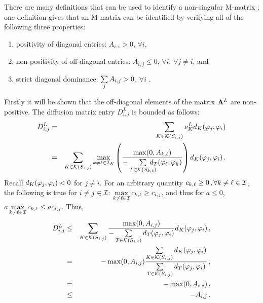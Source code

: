 
\begin{prf}
  There are many definitions that can be used to identify a non-singular M-matrix
  \cite{m_matrix_fiedler}; one
  definition gives that an M-matrix can be identified by verifying all of the
  following three properties:
  \begin{enumerate}
    \item positivity of diagonal entries: $A_{i,i} > 0$, $\forall i$,
    \item non-positivity of off-diagonal entries: $A_{i,j} \leq 0$,
      $\forall i$, $\forall j\ne i$, and
    \item strict diagonal dominance: $\sumj A_{i,j} > 0$, $\forall i$ \cite{m_matrix_poole}.
  \end{enumerate}
Firstly it will be shown that the off-diagonal elements of the matrix
$\A^L$ are non-positive.
The diffusion matrix entry $D^L_{i,j}$ is bounded as follows:
\begin{eqnarray*}
   D_{i,j}^L & = & \sumKSij\nu^L_K d_K(\test_j,\test_i)\\
          & = & \sumKSij\max\limits_{k\ne \ell\in \indices_K}
            \pr{\frac{\max(0,A_{k,\ell})}
              {-\sum\limits_{T\in\mathcal{K}(S_{k,\ell})}
              \mkern-20mu d_T(\test_\ell,\test_k)}} d_K(\test_j,\test_i) \eqp
\end{eqnarray*}
Recall $d_K(\test_j,\test_i) < 0$ for $j\ne i$.
For an arbitrary quantity $c_{k,\ell} \geq 0 \eqc \forall k\ne\ell\in\indices$,
the following is true for $i\ne j\in\indices$:
$\max\limits_{k\ne\ell\in\indices}c_{k,\ell} \geq c_{i,j}$, and thus for $a\leq 0$,
$a\max\limits_{k\ne\ell\in\indices}c_{k,\ell} \leq a c_{i,j}$.
Thus,
\begin{eqnarray*}
   D^L_{i,j} & \le & \sumKSij \frac{\max(0,A_{i,j})}
    {-\sumKSij[T] d_T(\test_j,\test_i)}
    d_K(\test_j,\test_i) \eqc\\
      & = & -\max(0,A_{i,j}) \frac{\sumKSij d_K(\test_j,\test_i)}
        {\sumKSij[T] d_T(\test_j,\test_i)} \eqc\\
        & = & -\max(0,A_{i,j}) \eqc\\
        & \le & -A_{i,j} \eqp
\end{eqnarray*}

\end{prf}
